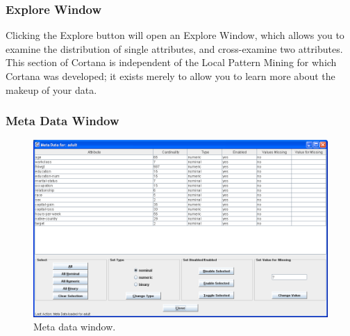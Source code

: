 \documentclass{article}
\begin{document}

\subsubsection{Explore Window}

Clicking the Explore button will open an Explore Window, which allows you to
examine the distribution of single attributes, and cross-examine two
attributes.  This section of Cortana is independent of the Local Pattern
Mining for which Cortana was developed; it exists merely to allow you to
learn more about the makeup of your data.

\subsubsection{Meta Data Window}
\label{sec:metadata}

\begin{figure}
\begin{center}
\includegraphics[width=\columnwidth]{metadatawindow.png}
\caption{Meta data window.}
\end{center}
\label{fig:metadatawindow}
\end{figure}
\end{document}
